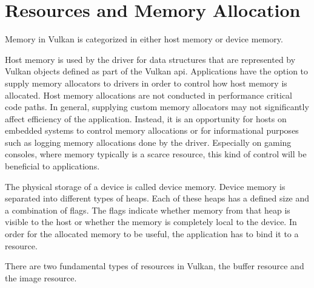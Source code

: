   \section{Resources and Memory Allocation}
  \label{sec:MemoryManagement}
    Memory in Vulkan is categorized in either \gls{host} memory or \gls{device} memory.

    Host memory is used by the \gls{driver} for data structures that are represented by Vulkan objects defined as part of the Vulkan \gls{api}.
    Applications have the option to supply memory allocators to \glspl{driver} in order to control how \gls{host} memory is allocated.
    Host memory allocations are not conducted in performance critical code paths.
    In general, supplying custom memory allocators may not significantly affect efficiency of the \gls{application}.
    Instead, it is an opportunity for \glspl{host} on embedded systems to control memory allocations or for informational purposes such as logging memory allocations done by the \gls{driver}.
    Especially on gaming consoles, where memory typically is a scarce resource, this kind of control will be beneficial to applications.

    The physical storage of a device is called device memory. Device memory is separated into different types of heaps. Each of these heaps has a defined size and a combination of flags. The flags indicate whether memory from that heap is visible to the \gls{host} or whether the memory is completely local to the device. In order for the allocated memory to be useful, the \gls{application} has to bind it to a resource.

    There are two fundamental types of resources in Vulkan, the buffer resource and the image resource.

